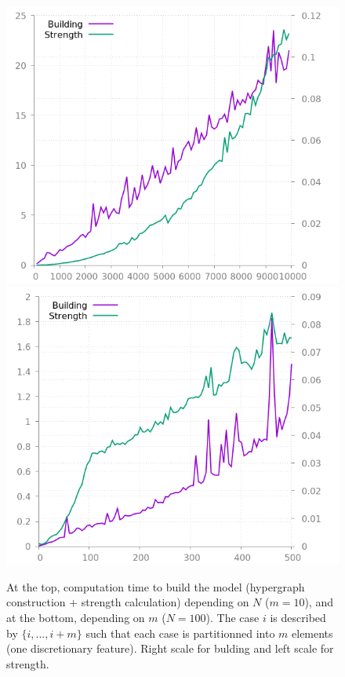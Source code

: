 \documentclass[preprint,12pt]{elsarticle}
\theoremstyle{definition}
\begin{document}
\begin{figure}[!h]
\centering
\includegraphics[scale=0.3]{img/time_k.png}
\hfill
\includegraphics[scale=0.3]{img/time_n_old.png}
\caption{At the top, computation time to build the model (hypergraph construction + strength calculation) depending on $N$ ($m = 10$), and at the bottom, depending on $m$ ($N = 100$). The case $i$ is described by $\{i, ...,  i+m\}$ such that each case is partitionned into $m$ elements (one discretionary feature). Right scale for bulding and left scale for strength.}
\label{fig:time}
\end{figure}
\end{document}
